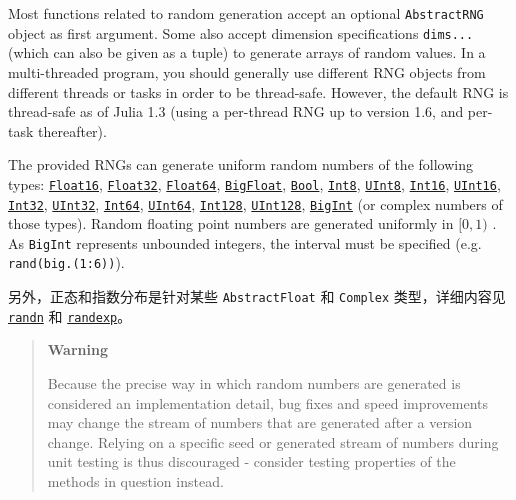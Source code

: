 Most functions related to random generation accept an optional \texttt{AbstractRNG} object as first argument. Some also accept dimension specifications \texttt{dims...} (which can also be given as a tuple) to generate arrays of random values. In a multi-threaded program, you should generally use different RNG objects from different threads or tasks in order to be thread-safe. However, the default RNG is thread-safe as of Julia 1.3 (using a per-thread RNG up to version 1.6, and per-task thereafter).



The provided RNGs can generate uniform random numbers of the following types: \hyperlink{2727296760866702904}{\texttt{Float16}}, \hyperlink{8101639384272933082}{\texttt{Float32}}, \hyperlink{5027751419500983000}{\texttt{Float64}}, \hyperlink{749816618809421837}{\texttt{BigFloat}}, \hyperlink{46725311238864537}{\texttt{Bool}}, \hyperlink{5857518405103968275}{\texttt{Int8}}, \hyperlink{6609065134969660118}{\texttt{UInt8}}, \hyperlink{6667287249103968645}{\texttt{Int16}}, \hyperlink{7018610346698168012}{\texttt{UInt16}}, \hyperlink{10103694114785108551}{\texttt{Int32}}, \hyperlink{8690996847580776341}{\texttt{UInt32}}, \hyperlink{7720564657383125058}{\texttt{Int64}}, \hyperlink{5500998675195555601}{\texttt{UInt64}}, \hyperlink{8012327724714767060}{\texttt{Int128}}, \hyperlink{14811222188335428522}{\texttt{UInt128}}, \hyperlink{423405808990690832}{\texttt{BigInt}} (or complex numbers of those types). Random floating point numbers are generated uniformly in  \([0, 1)\) . As \texttt{BigInt} represents unbounded integers, the interval must be specified (e.g. \texttt{rand(big.(1:6))}).



另外，正态和指数分布是针对某些 \texttt{AbstractFloat} 和 \texttt{Complex} 类型，详细内容见 \hyperlink{7347069443766288058}{\texttt{randn}} 和 \hyperlink{17131026676213441996}{\texttt{randexp}}。



\begin{quote}
\textbf{Warning}

Because the precise way in which random numbers are generated is considered an implementation detail, bug fixes and speed improvements may change the stream of numbers that are generated after a version change. Relying on a specific seed or generated stream of numbers during unit testing is thus discouraged - consider testing properties of the methods in question instead.

\end{quote}


